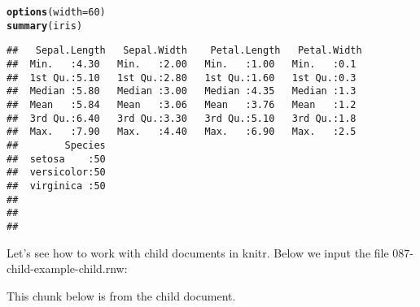 \documentclass{article}\usepackage[]{graphicx}\usepackage[]{color}
\makeatletter
\newcommand{\hlnum}[1]{\textcolor[rgb]{0.686,0.059,0.569}{#1}}%
\newcommand{\hlstd}[1]{\textcolor[rgb]{0.345,0.345,0.345}{#1}}%
\newcommand{\hlkwc}[1]{\textcolor[rgb]{0.333,0.667,0.333}{#1}}%
\newcommand{\hlkwd}[1]{\textcolor[rgb]{0.737,0.353,0.396}{\textbf{#1}}}%
\newenvironment{kframe}{%
 \def\at@end@of@kframe{}%
 \ifinner\ifhmode%
  \def\at@end@of@kframe{\end{minipage}}%
  \begin{minipage}{\columnwidth}%
 \fi\fi%
 \def\FrameCommand##1{\hskip\@totalleftmargin \hskip-\fboxsep
 \colorbox{shadecolor}{##1}\hskip-\fboxsep
     \hskip-\linewidth \hskip-\@totalleftmargin \hskip\columnwidth}%
 \MakeFramed {\advance\hsize-\width
   \@totalleftmargin\z@ \linewidth\hsize
   \@setminipage}}%
 {\par\unskip\endMakeFramed%
 \at@end@of@kframe}
\newenvironment{knitrout}{}{} %
\makeatother
\begin{document}
\begin{knitrout}
\color{fgcolor}\begin{kframe}
\begin{alltt}
\hlkwd{options}\hlstd{(}\hlkwc{width} \hlstd{=} \hlnum{60}\hlstd{)}
\hlkwd{summary}\hlstd{(iris)}
\end{alltt}
\begin{verbatim}
##   Sepal.Length   Sepal.Width    Petal.Length   Petal.Width 
##  Min.   :4.30   Min.   :2.00   Min.   :1.00   Min.   :0.1  
##  1st Qu.:5.10   1st Qu.:2.80   1st Qu.:1.60   1st Qu.:0.3  
##  Median :5.80   Median :3.00   Median :4.35   Median :1.3  
##  Mean   :5.84   Mean   :3.06   Mean   :3.76   Mean   :1.2  
##  3rd Qu.:6.40   3rd Qu.:3.30   3rd Qu.:5.10   3rd Qu.:1.8  
##  Max.   :7.90   Max.   :4.40   Max.   :6.90   Max.   :2.5  
##        Species  
##  setosa    :50  
##  versicolor:50  
##  virginica :50  
##                 
##                 
## 
\end{verbatim}
\end{kframe}
\end{knitrout}


Let's see how to work with child documents in knitr. Below we input
the file \textsf{087-child-example-child.rnw}:


This chunk below is from the child document.
\end{document}

